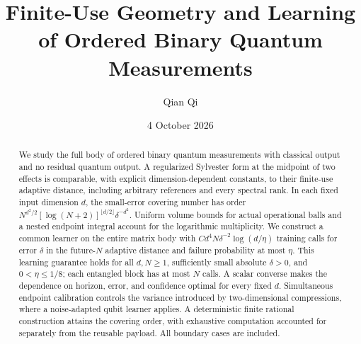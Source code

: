\documentclass[11pt]{amsart}
\title[Finite-use measurement geometry and learning]{Finite-Use Geometry and Learning of Ordered Binary Quantum Measurements}
\author{Qian Qi}
\date{4 October 2026}
\numberwithin{equation}{section}
\theoremstyle{definition}\newtheorem{definition}[theorem]{Definition}
\theoremstyle{remark}\newtheorem{remark}[theorem]{Remark}
\begin{document}
\raggedbottom
\begin{abstract}
We study the full body of ordered binary quantum measurements with
classical output and no residual quantum output. A regularized
Sylvester form at the midpoint of two effects is comparable, with
explicit dimension-dependent constants, to their finite-use adaptive
distance, including arbitrary references and every spectral rank.
In each fixed input dimension $d$, the small-error covering number
has order
\mbox{$N^{d^2/2}[\log(N+2)]^{\lfloor d/2\rfloor}\delta^{-d^2}$}.
Uniform volume bounds for actual operational balls and a nested
endpoint integral account for the logarithmic multiplicity.
We construct a common learner on the entire matrix body with
$Cd^4N\delta^{-2}\log(d/\eta)$ training calls for error $\delta$ in
the future-$N$ adaptive distance and failure probability at most $\eta$.
This learning guarantee holds for all $d,N\ge1$, sufficiently small absolute
$\delta>0$, and $0<\eta\le1/8$; each entangled block has at most $N$
calls. A scalar converse makes the dependence on horizon, error, and
confidence optimal for every fixed $d$. Simultaneous endpoint
calibration controls the variance introduced by two-dimensional
compressions, where a noise-adapted qubit learner applies.
A deterministic finite rational construction attains the covering
order, with exhaustive computation accounted for separately from
the reusable payload. All boundary cases are included.
\end{abstract}
\maketitle










\appendix


\end{document}
